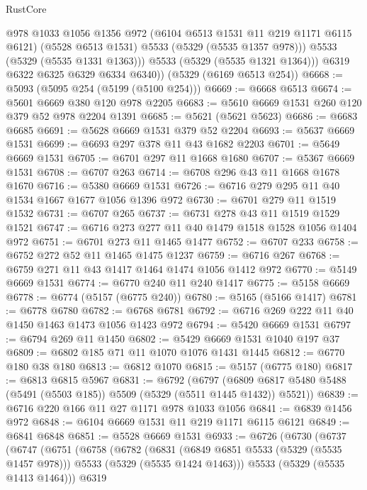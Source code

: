 \begin{lexlean}{RustCore}
\begin{coremodule}
              @978
              @1033
              @1056
              @1356
              @972
              (@6104 @6513 @1531 @11 @219 @1171 @6115 @6121)
              (@5528 @6513 @1531)
              @5533
              (@5329 (@5535 @1357 @978)))
            @5533
            (@5329 (@5535 @1331 @1363)))
          @5533
          (@5329 (@5535 @1321 @1364)))
        @6319
        @6322
        @6325
        @6329
        @6334
        @6340))
    (@5329 (@6169 @6513 @254))
@6668 := @5093 (@5095 @254 (@5199 (@5100 @254)))
@6669 := @6668 @6513
@6674 := @5601 @6669 @380 @120 @978 @2205
@6683 := @5610 @6669 @1531 @260 @120 @379 @52 @978 @2204 @1391
@6685 := @5621 (@5621 @5623)
@6686 := @6683 @6685
@6691 := @5628 @6669 @1531 @379 @52 @2204
@6693 := @5637 @6669 @1531
@6699 := @6693 @297 @378 @11 @43 @1682 @2203
@6701 := @5649 @6669 @1531
@6705 := @6701 @297 @11 @1668 @1680
@6707 := @5367 @6669 @1531
@6708 := @6707 @263
@6714 := @6708 @296 @43 @11 @1668 @1678 @1670
@6716 := @5380 @6669 @1531
@6726 := @6716 @279 @295 @11 @40 @1534 @1667 @1677 @1056 @1396 @972
@6730 := @6701 @279 @11 @1519 @1532
@6731 := @6707 @265
@6737 := @6731 @278 @43 @11 @1519 @1529 @1521
@6747 := @6716 @273 @277 @11 @40 @1479 @1518 @1528 @1056 @1404 @972
@6751 := @6701 @273 @11 @1465 @1477
@6752 := @6707 @233
@6758 := @6752 @272 @52 @11 @1465 @1475 @1237
@6759 := @6716 @267
@6768 := @6759 @271 @11 @43 @1417 @1464 @1474 @1056 @1412 @972
@6770 := @5149 @6669 @1531
@6774 := @6770 @240 @11 @240 @1417
@6775 := @5158 @6669
@6778 := @6774 (@5157 (@6775 @240))
@6780 := @5165 (@5166 @1417)
@6781 := @6778 @6780
@6782 := @6768 @6781
@6792 := @6716 @269 @222 @11 @40 @1450 @1463 @1473 @1056 @1423 @972
@6794 := @5420 @6669 @1531
@6797 := @6794 @269 @11 @1450
@6802 := @5429 @6669 @1531 @1040 @197 @37
@6809 := @6802 @185 @71 @11 @1070 @1076 @1431 @1445
@6812 := @6770 @180 @38 @180
@6813 := @6812 @1070
@6815 := @5157 (@6775 @180)
@6817 := @6813 @6815 @5967
@6831 := @6792
    (@6797 (@6809 @6817 @5480 @5488 (@5491 (@5503 @185)) @5509 (@5329 (@5511 @1445 @1432)) @5521))
@6839 := @6716 @220 @166 @11 @27 @1171 @978 @1033 @1056
@6841 := @6839 @1456 @972
@6848 := @6104 @6669 @1531 @11 @219 @1171 @6115 @6121
@6849 := @6841 @6848
@6851 := @5528 @6669 @1531
@6933 := @6726
    (@6730
      (@6737
        (@6747
          (@6751
            (@6758
              (@6782
                (@6831
                  (@6849 @6851 @5533 (@5329 (@5535 @1457 @978)))
                  @5533
                  (@5329 (@5535 @1424 @1463)))
                @5533
                (@5329 (@5535 @1413 @1464)))
              @6319

\end{coremodule}
\end{lexlean}
